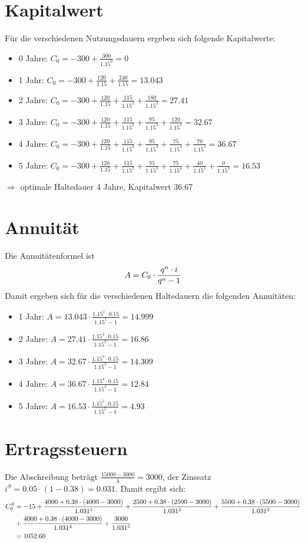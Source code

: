 \documentclass{article}
\begin{document}
	\section*{Kapitalwert}
	Für die verschiedenen Nutzungsdauern ergeben sich folgende Kapitalwerte:
	\begin{itemize}
		\item 0 Jahre: $C_0 = -300 + \frac{300}{1.15^0} = 0$ 
		\item 1 Jahr: $C_0 = -300 + \frac{120}{1.15} + \frac{240}{1.15} = 13.043$
		\item 2 Jahre: $C_0 = -300 + \frac{120}{1.15} + \frac{115}{1.15^2} + \frac{180}{1.15^2} = 27.41$
		\item 3 Jahre: $C_0 = -300 + \frac{120}{1.15} + \frac{115}{1.15^2} + \frac{95}{1.15^3} + \frac{120}{1.15^3} = 32.67$
		\item 4 Jahre: $C_0 = -300 + \frac{120}{1.15} + \frac{115}{1.15^2} + \frac{95}{1.15^3} + \frac{75}{1.15^4} + \frac{70}{1.15^4} = 36.67$
		\item 5 Jahre: $C_0 = -300 + \frac{120}{1.15} + \frac{115}{1.15^2} + \frac{95}{1.15^3} + \frac{75}{1.15^4} + \frac{40}{1.15^5} + \frac{0}{1.15^5} = 16.53$
	\end{itemize}
	$\Rightarrow$ optimale Haltedauer 4 Jahre, Kapitalwert 36.67
	
	\section*{Annuität}
	Die Annuitätenformel ist
	\begin{align}
		A = C_0\cdot\frac{q^n\cdot i}{q^n-1} \notag
	\end{align}
	Damit ergeben sich für die verschiedenen Haltedauern die folgenden Annuitäten:
	\begin{itemize}
		\item 1 Jahr: $A = 13.043 \cdot \frac{1.15^1\cdot 0.15}{1.15^1 - 1} = 14.999$
		\item 2 Jahre: $A = 27.41 \cdot \frac{1.15^2\cdot 0.15}{1.15^2 - 1} = 16.86$
		\item 3 Jahre: $A = 32.67 \cdot \frac{1.15^3\cdot 0.15}{1.15^3 - 1} = 14.309$
		\item 4 Jahre: $A = 36.67 \cdot \frac{1.15^4\cdot 0.15}{1.15^4 - 1} = 12.84$
		\item 5 Jahre: $A = 16.53 \cdot \frac{1.15^5\cdot 0.15}{1.15^5 - 1} = 4.93$
	\end{itemize}
	
	\section*{Ertragssteuern}
	Die Abschreibung beträgt $\frac{15000 - 3000}{4} = 3000$, der Zinssatz $i^S = 0.05\cdot (1-0.38) = 0.031$. Damit ergibt sich:
	\begin{align}
		C_0^S &= -15 + \frac{4000 + 0.38\cdot (4000 - 3000)}{1.031^1} + \frac{2500 + 0.38\cdot (2500 - 3000)}{1.031^2} + \frac{5500 + 0.38\cdot (5500 - 3000)}{1.031^3} \notag \\
		&+ \frac{4000 + 0.38\cdot (4000 - 3000)}{1.031^4} + \frac{3000}{1.031^5} \notag \\
		&= 1052.60 \notag
	\end{align}
	
\end{document}
